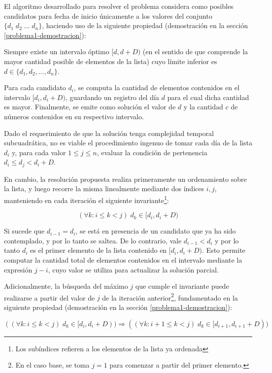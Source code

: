 El algoritmo desarrollado para resolver el problema considera como posibles candidatos para fecha de inicio únicamente a los valores del conjunto $\{d_1\;d_2\;...\;d_n\}$, haciendo uso de la siguiente propiedad (demostración en la sección \ref{problema1-demostracion}):

\begin{propiedad}\label{propiedad-candidatos}
Siempre existe un intervalo óptimo $[d, d + D)$ (en el sentido de que comprende la mayor cantidad posible de elementos de la lista) cuyo límite inferior es $d \in \{d_1,d_2,...,d_n\}$.
\end{propiedad}

Para cada candidato $d_i$, se computa la cantidad de elementos contenidos en el intervalo $[d_i, d_i + D)$, guardando un registro del día $d$ para el cual dicha cantidad es mayor. Finalmente, se emite como solución el valor de $d$ y la cantidad $c$ de números contenidos en su respectivo intervalo.

Dado el requerimiento de que la solución tenga complejidad temporal subcuadrática, no es viable el procedimiento ingenuo de tomar cada día de la lista $d_i$ y, para cada valor $1 \leq j \leq n$, evaluar la condición de pertenencia $d_i \leq d_j < d_i + D$.

En cambio, la resolución propuesta realiza primeramente un ordenamiento sobre la lista, y luego recorre la misma linealmente mediante dos índices $i,j$, manteniendo en cada iteración el siguiente invariante\footnote{Los subíndices refieren a los elementos de la lista ya ordenada}:

$$(\forall k: i \leq k < j)\;d_k \in [d_i, d_i + D)$$

Si sucede que $d_{i-1} = d_i$, se está en presencia de un candidato que ya ha sido contemplado, y por lo tanto se saltea. De lo contrario, vale $d_{i-1} < d_i$ y por lo tanto $d_i$ es el primer elemento de la lista contenido en $[d_i, d_i + D)$. Esto permite computar la cantidad total de elementos contenidos en el intervalo mediante la expresión $j - i$, cuyo valor se utiliza para actualizar la solución parcial.

Adicionalmente, la búsqueda del máximo $j$ que cumple el invariante puede realizarse a partir del valor de $j$ de la iteración anterior\footnote{En el caso base, se toma $j = 1$ para comenzar a partir del primer elemento.}, fundamentado en la siguiente propiedad (demostración en la sección \ref{problema1-demostracion}):

\begin{propiedad}\label{propiedad-maximo-j}
$$((\forall k: i \leq k < j)\;d_k \in [d_i, d_i + D)) \Rightarrow ((\forall k: i + 1 \leq k < j)\;d_k \in [d_{i+1}, d_{i+1} + D))$$
\end{propiedad}

